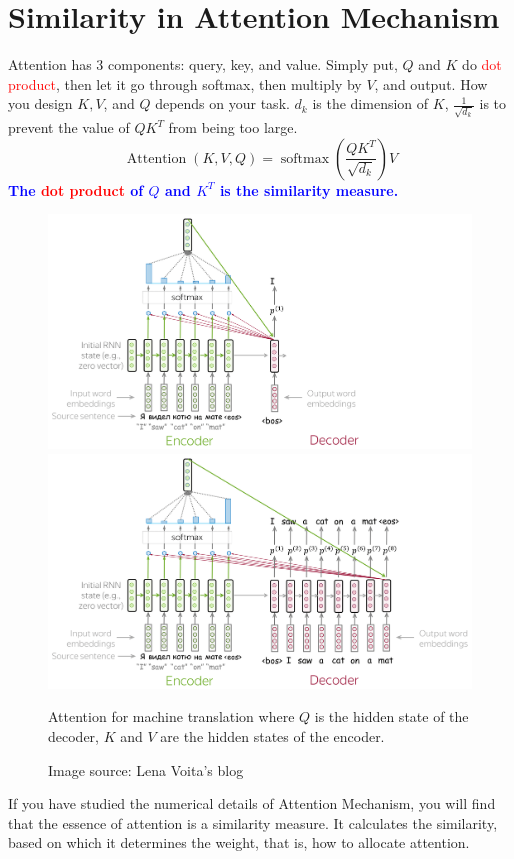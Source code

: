 \documentclass[oneside]{book}
\begin{document}
\section{Similarity in Attention Mechanism}
Attention has 3 components: query, key, and value. 
Simply put, $Q$ and $K$ do \textcolor{red}{dot product}, then let it go through softmax, then multiply by $V$, and output. How you design $K, V$, and $Q$ depends on your task. $d_k$ is the dimension of $K$, $\frac{1}{\sqrt{d_k}}$ is to prevent the value of $Q K^T$ from being too large.
\begin{equation}
        \operatorname{Attention}(K, V, Q)=\operatorname{softmax}\left(\frac{Q K^T}{\sqrt{d_k}}\right) V
\end{equation}
\textbf{\textcolor{blue}{The \textcolor{red}{dot product} of $Q$ and $K^T$ is the similarity measure.}}
\begin{figure}[H]
        \centering
        \includegraphics[width=1.0\textwidth]{images/1-min.png}
        \includegraphics[width=1.0\textwidth]{images/8-min.png}
        \caption{Attention for machine translation where $Q$ is the hidden state of the decoder, $K$ and $V$ are the hidden states of the encoder.}
        \caption*{Image source: Lena Voita's blog}
\end{figure}
If you have studied the numerical details of Attention Mechanism, you will find that the essence of attention is a similarity measure.
It calculates the similarity, based on which it determines the weight, that is, how to allocate attention.
\end{document}
